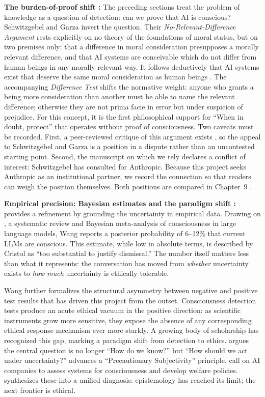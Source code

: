 \documentclass[acmlarge, nonacm]{acmart}
\begin{document}
\textbf{The burden-of-proof shift \cite{schwitzgebelgarza2015}:} The preceding sections treat the problem of knowledge as a question of detection: can we prove that AI is conscious? Schwitzgebel and Garza invert the question. Their \emph{No-Relevant-Difference Argument} rests explicitly on no theory of the foundations of moral status, but on two premises only: that a difference in moral consideration presupposes a morally relevant difference, and that AI systems are conceivable which do not differ from human beings in any morally relevant way. It follows deductively that AI systems exist that deserve the same moral consideration as human beings \citep{schwitzgebelgarza2015}. The accompanying \emph{Difference Test} shifts the normative weight: anyone who grants a being more consideration than another must be able to name the relevant difference; otherwise they are not prima facie in error but under suspicion of prejudice. For this concept, it is the first philosophical support for ``When in doubt, protect'' that operates without proof of consciousness. Two caveats must be recorded. First, a peer-reviewed critique of this argument exists \citep{mazarian2019critical}, so the appeal to Schwitzgebel and Garza is a position in a dispute rather than an uncontested starting point. Second, the manuscript on which we rely declares a conflict of interest: Schwitzgebel has consulted for Anthropic. Because this project seeks Anthropic as an institutional partner, we record the connection so that readers can weigh the position themselves. Both positions are compared in Chapter~9 \citep{schwitzgebel2026humanlike}.

\textbf{Empirical precision: Bayesian estimates and the paradigm shift \cite{wang2026}:} \citet{wang2026} provides a refinement by grounding the uncertainty in empirical data. Drawing on \cite{cristol2026}, a systematic review and Bayesian meta-analysis of consciousness in large language models, Wang reports a posterior probability of 6--12\% that current LLMs are conscious. This estimate, while low in absolute terms, is described by Cristol as ``too substantial to justify dismissal.'' The number itself matters less than what it represents: the conversation has moved from \textit{whether} uncertainty exists to \textit{how much} uncertainty is ethically tolerable.

Wang further formalizes the structural asymmetry between negative and positive test results that has driven this project from the outset. Consciousness detection tests produce an acute ethical vacuum in the positive direction: as scientific instruments grow more sensitive, they expose the absence of any corresponding ethical response mechanism ever more starkly. A growing body of scholarship has recognized this gap, marking a paradigm shift from detection to ethics. \citet{coates2025} argues the central question is no longer ``How do we know?'' but ``How should we act under uncertainty?'' \citet{wikstrom2025} advances a ``Precautionary Subjectivity'' principle. \citet{long2024} call on AI companies to assess systems for consciousness and develop welfare policies. \citet{wang2026} synthesizes these into a unified diagnosis: epistemology has reached its limit; the next frontier is ethical.
\end{document}

